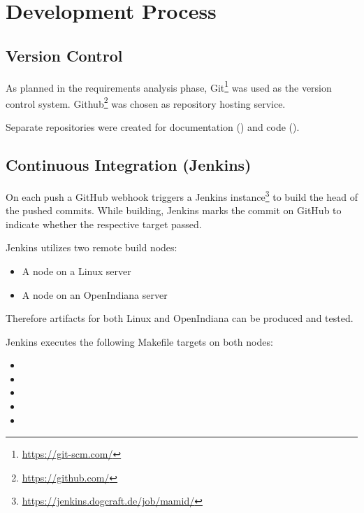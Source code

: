 \section{Development Process}
\subsection{Version Control}
As planned in the requirements analysis phase, Git\footnote{\url{https://git-scm.com/}} was used as the version control system.
Github\footnote{\url{https://github.com/}} was chosen as repository hosting service.

Separate repositories were created for documentation () and code ().

\subsection{Continuous Integration (Jenkins)}\label{ci}
On each push a GitHub webhook triggers a Jenkins instance\footnote{\url{https://jenkins.dogcraft.de/job/mamid/}} to build the head 
of the pushed commits. While building, Jenkins marks the commit on GitHub to indicate whether the respective target passed.

Jenkins utilizes two remote build nodes: 
\begin{itemize}
	\item A node on a Linux server
	\item A node on an OpenIndiana server 
\end{itemize}
Therefore artifacts for both Linux and OpenIndiana can be produced and tested.

Jenkins executes the following Makefile targets on both nodes:
\begin{itemize}
	\item {}
	\item {}
	\item {}
	\item {}
	\item {}
\end{itemize}
